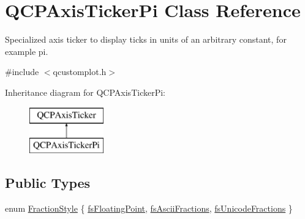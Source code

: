 \hypertarget{class_q_c_p_axis_ticker_pi}{}\section{Q\+C\+P\+Axis\+Ticker\+Pi Class Reference}
\label{class_q_c_p_axis_ticker_pi}


Specialized axis ticker to display ticks in units of an arbitrary constant, for example pi.  




{\ttfamily \#include $<$qcustomplot.\+h$>$}

Inheritance diagram for Q\+C\+P\+Axis\+Ticker\+Pi\+:\begin{figure}[H]
\begin{center}
\leavevmode
\includegraphics[height=2.000000cm]{d4/da4/class_q_c_p_axis_ticker_pi}
\end{center}
\end{figure}
\subsection*{Public Types}
\begin{DoxyCompactItemize}
\item 
enum \mbox{\hyperlink{class_q_c_p_axis_ticker_pi_a262f1534c7f0c79a7d5237f5d1e2c54c}{Fraction\+Style}} \{ \mbox{\hyperlink{class_q_c_p_axis_ticker_pi_a262f1534c7f0c79a7d5237f5d1e2c54ca00f097b669b2a0e22f508f1ae97877d8}{fs\+Floating\+Point}}, 
\mbox{\hyperlink{class_q_c_p_axis_ticker_pi_a262f1534c7f0c79a7d5237f5d1e2c54ca05a5457e0e14cb726f623e25282066b3}{fs\+Ascii\+Fractions}}, 
\mbox{\hyperlink{class_q_c_p_axis_ticker_pi_a262f1534c7f0c79a7d5237f5d1e2c54ca92f38a938c8b179b23363d9993681c55}{fs\+Unicode\+Fractions}}
 \}
\end{DoxyCompactItemize}
